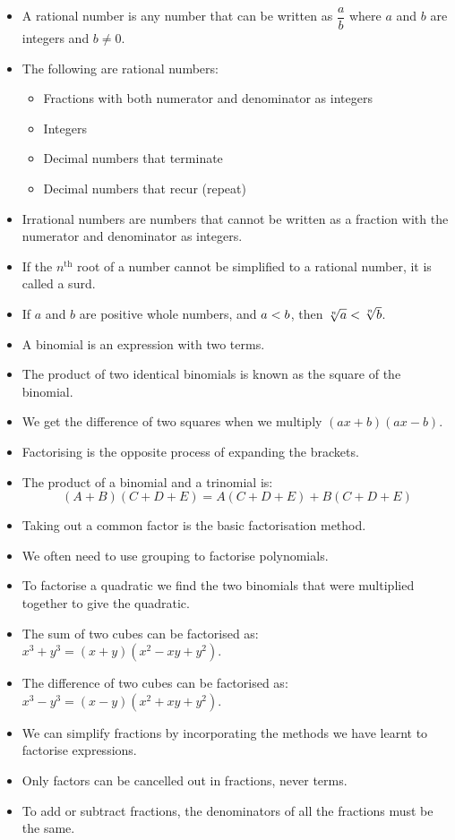 

\begin{itemize}[itemsep=5pt]

\item  A rational number is any number that can be written as $\dfrac{a}{b}$
where $a$ and $b$ are integers and $b\ne 0$.
\item The following are rational numbers:
    \begin{itemize}[noitemsep]
	\item Fractions with both numerator and denominator as integers
	\item Integers
	\item Decimal numbers that terminate
	\item Decimal numbers that recur (repeat)
    \end{itemize}
\item Irrational numbers are numbers that cannot be written as a fraction with the numerator and denominator as integers.
\item If the ${n}^{\mathrm{th}}$ root of a number cannot be simplified to a rational number, it is called a surd.
\item If $a$ and $b$ are positive whole numbers, and $a<{}b$, then $\sqrt[n]{a}<{}\sqrt[n]{b}$.
\item A binomial is an expression with two terms. 
\item The product of two identical binomials is known as the square of the binomial. 
\item We get the difference of two squares when we multiply $(ax+b)(ax-b)$.
\item Factorising is the opposite process of expanding the brackets.
\item The product of a binomial and a trinomial is:
  \begin{equation*}
    (A+B)(C+D+E)=A(C+D+E)+B(C+D+E)
  \end{equation*}

\item Taking out a common factor is the basic factorisation method.
\item We often need to use grouping to factorise polynomials.
\item To factorise a quadratic we find the two binomials that were multiplied together to give the quadratic.
\item The sum of two cubes can be factorised as: ${x}^{3}+{y}^{3}=(x+y)({x}^{2}-xy+{y}^{2})$. 
\item The difference of two cubes can be factorised as: ${x}^{3}-{y}^{3}=(x-y)({x}^{2}+xy+{y}^{2})$.
\item We can simplify fractions by incorporating the methods we have learnt to factorise expressions.
\item Only factors can be cancelled out in fractions, never terms.
\item To add or subtract fractions, the denominators of all the fractions must be the same.

\end{itemize}


